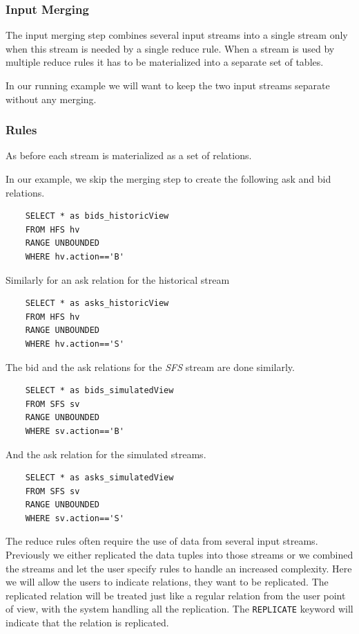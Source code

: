 \documentclass{article}
\begin{document}
\subsubsection{Input Merging}

The input merging step combines several input streams into a single stream only when this stream is needed by a single reduce rule. When a stream is used by multiple reduce rules it has to be materialized into a separate set of tables. 

In our running example we will want to keep the two input streams separate without any merging. 

\subsubsection{Rules}

As before each stream is materialized as a set of relations. 

In our example, we skip the merging step to create the following ask and bid relations.

\begin{verbatim}  
    SELECT * as bids_historicView
    FROM HFS hv
    RANGE UNBOUNDED
    WHERE hv.action=='B'
\end{verbatim}

\noindent Similarly for an ask relation for the historical stream

\begin{verbatim}  
    SELECT * as asks_historicView
    FROM HFS hv
    RANGE UNBOUNDED
    WHERE hv.action=='S'
\end{verbatim}

\noindent The bid and the ask relations for the \emph{SFS} stream are done similarly.

\begin{verbatim}  
    SELECT * as bids_simulatedView
    FROM SFS sv
    RANGE UNBOUNDED
    WHERE sv.action=='B'
\end{verbatim}

\noindent And the ask relation for the simulated streams.

\begin{verbatim}  
    SELECT * as asks_simulatedView
    FROM SFS sv
    RANGE UNBOUNDED
    WHERE sv.action=='S'
\end{verbatim}


The reduce rules often require the use of data from several input streams. Previously we either replicated the data tuples into those streams or we combined the streams and let the user specify rules to handle an increased complexity. Here we will allow the users to indicate relations, they want to be replicated. The replicated relation will be treated just like a regular relation from the user point of view, with the system handling all the replication. The {\tt REPLICATE} keyword will indicate that the relation is replicated. 
\end{document}
